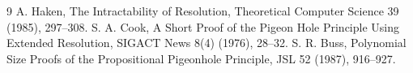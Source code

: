 \documentclass[11pt]{article}
\begin{document}
\begin{thebibliography}{9}
 A. Haken, The Intractability of Resolution, Theoretical Computer Science 39 (1985), 297--308.
 S. A. Cook, A Short Proof of the Pigeon Hole Principle Using Extended Resolution, SIGACT News 8(4) (1976), 28--32.
 S. R. Buss, Polynomial Size Proofs of the Propositional Pigeonhole Principle, JSL 52 (1987), 916--927.
\end{thebibliography}
\end{document}
